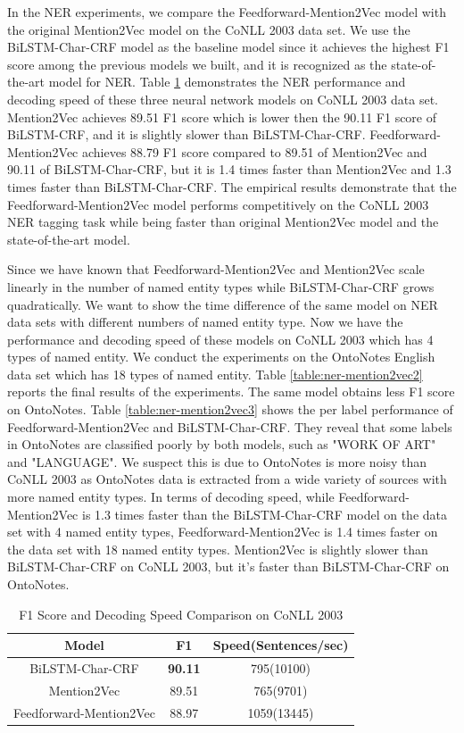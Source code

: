 In the NER experiments, we compare the Feedforward-Mention2Vec model with the original Mention2Vec model on the CoNLL 2003 data set. We use the BiLSTM-Char-CRF model as the baseline model since it achieves the highest F1 score among the previous models we built, and it is recognized as the state-of-the-art model for NER. Table \ref{table:ner-mention2vec1} demonstrates the NER performance and decoding speed of these three neural network models on CoNLL 2003 data set. Mention2Vec achieves 89.51 F1 score which is lower then the 90.11 F1 score of BiLSTM-CRF, and it is slightly slower than BiLSTM-Char-CRF. Feedforward-Mention2Vec achieves 88.79 F1 score compared to 89.51 of Mention2Vec and 90.11 of BiLSTM-Char-CRF, but it is 1.4 times faster than Mention2Vec and 1.3 times faster than BiLSTM-Char-CRF. The empirical results demonstrate that the Feedforward-Mention2Vec model performs competitively on the CoNLL 2003 NER tagging task while being faster than original Mention2Vec model and the state-of-the-art model.

Since we have known that Feedforward-Mention2Vec and Mention2Vec scale linearly in the number of named entity types while BiLSTM-Char-CRF grows quadratically. We want to show the time difference of the same model on NER data sets with different numbers of named entity type. Now we have the performance and decoding speed of these models on CoNLL 2003 which has 4 types of named entity. We conduct the experiments on the OntoNotes English data set which has 18 types of named entity. Table \ref{table:ner-mention2vec2} reports the final results of the experiments. The same model obtains less F1 score on OntoNotes. Table \ref{table:ner-mention2vec3} shows the per label performance of Feedforward-Mention2Vec and BiLSTM-Char-CRF. They reveal that some labels in OntoNotes are classified poorly by both models, such as "WORK OF ART" and "LANGUAGE". We suspect this is due to OntoNotes is more noisy than CoNLL 2003 as OntoNotes data is extracted from a wide variety of sources with more named entity types. In terms of decoding speed, while Feedforward-Mention2Vec is 1.3 times faster than the BiLSTM-Char-CRF model on the data set with 4 named entity types, Feedforward-Mention2Vec is 1.4 times faster on the data set with 18 named entity types. Mention2Vec is slightly slower than BiLSTM-Char-CRF on CoNLL 2003, but it's faster than BiLSTM-Char-CRF on OntoNotes.

\begin{table}[]
\centering
\caption{F1 Score and Decoding Speed Comparison on CoNLL 2003}
\label{table:ner-mention2vec1}
\begin{tabular}{|c|c|c|}
\hline
Model            & F1     & Speed(Sentences/sec)        \\ \hline
BiLSTM-Char-CRF & \textbf{90.11}  & 795(10100)            \\ \hline
Mention2Vec  & 89.51     & 765(9701)              \\ \hline
Feedforward-Mention2Vec  & 88.97  &  1059(13445)                   \\ \hline
\end{tabular}
\end{table}

